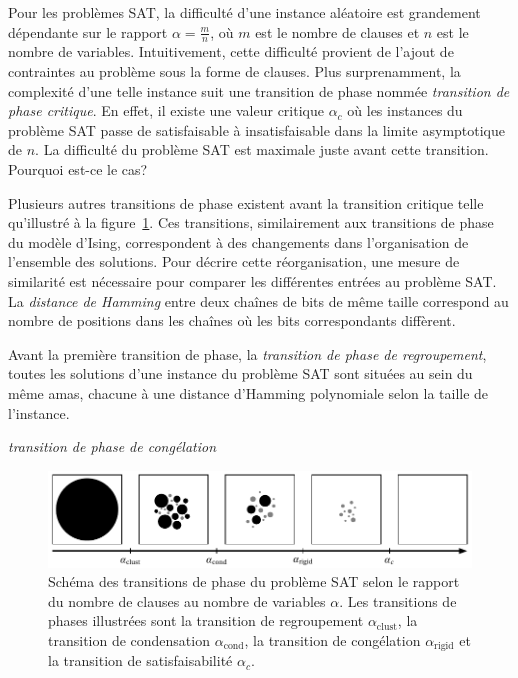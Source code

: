 Pour les problèmes SAT, la difficulté d'une instance aléatoire est grandement dépendante sur le rapport $\alpha = \frac{m}{n}$, où $m$ est le nombre de clauses et $n$ est le nombre de variables. Intuitivement, cette difficulté provient de l'ajout de contraintes au problème sous la forme de clauses. Plus surprenamment, la complexité d'une telle instance suit une transition de phase nommée \textit{transition de phase critique}. En effet, il existe une valeur critique $\alpha_{c}$ où les instances du problème SAT passe de satisfaisable à insatisfaisable dans la limite asymptotique de $n$. La difficulté du problème SAT est maximale juste avant cette transition. Pourquoi est-ce le cas?

Plusieurs autres transitions de phase existent avant la transition critique telle qu'illustré à la figure~\ref{fig:transitions-de-phase}. Ces transitions, similairement aux transitions de phase du modèle d'Ising, correspondent à des changements dans l'organisation de l'ensemble des solutions. Pour décrire cette réorganisation, une mesure de similarité est nécessaire pour comparer les différentes entrées au problème SAT. La \textit{distance de Hamming} entre deux chaînes de bits de même taille correspond au nombre de positions dans les chaînes où les bits correspondants diffèrent. 


Avant la première transition de phase, la \textit{transition de phase de regroupement}, toutes les solutions d'une instance du problème SAT sont situées au sein du même amas, chacune à une distance d'Hamming polynomiale selon la taille de l'instance.

\textit{transition de phase de congélation}



\begin{figure}[h]
    \centering
    \includegraphics[width=1\textwidth]{figures/phase-transitions.pdf}
    \caption[Transitions de phase du problème SAT]{Schéma des transitions de phase du problème SAT selon le rapport du nombre de clauses au nombre de variables $\alpha$. Les transitions de phases illustrées sont la transition de regroupement $\alpha_{\text{clust}}$, la transition de condensation $\alpha_{\text{cond}}$, la transition de congélation $\alpha_{\text{rigid}}$ et la transition de satisfaisabilité $\alpha_{c}$.}
    \label{fig:transitions-de-phase}
\end{figure}

